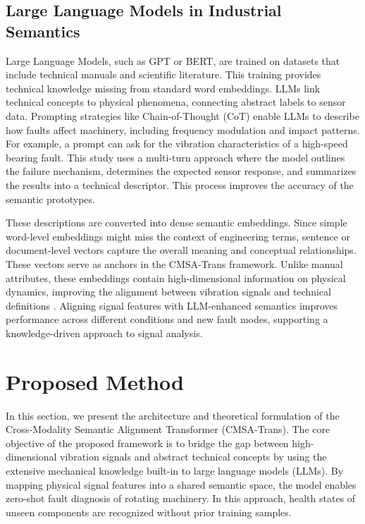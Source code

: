 \documentclass[journal]{IEEEtran}
\begin{document}
\subsection{Large Language Models in Industrial Semantics}

Large Language Models, such as GPT or BERT, are trained on datasets that include technical manuals and scientific literature. This training provides technical knowledge missing from standard word embeddings. LLMs link technical concepts to physical phenomena, connecting abstract labels to sensor data. Prompting strategies like Chain-of-Thought (CoT) enable LLMs to describe how faults affect machinery, including frequency modulation and impact patterns. For example, a prompt can ask for the vibration characteristics of a high-speed bearing fault. This study uses a multi-turn approach where the model outlines the failure mechanism, determines the expected sensor response, and summarizes the results into a technical descriptor. This process improves the accuracy of the semantic prototypes.

These descriptions are converted into dense semantic embeddings. Since simple word-level embeddings might miss the context of engineering terms, sentence or document-level vectors capture the overall meaning and conceptual relationships. These vectors serve as anchors in the CMSA-Trans framework. Unlike manual attributes, these embeddings contain high-dimensional information on physical dynamics, improving the alignment between vibration signals and technical definitions \cite{brown2020language, devlin2018bert, li2024industrial}. Aligning signal features with LLM-enhanced semantics improves performance across different conditions and new fault modes, supporting a knowledge-driven approach to signal analysis.

\section{Proposed Method}
\label{sec:method}

In this section, we present the architecture and theoretical formulation of the Cross-Modality Semantic Alignment Transformer (CMSA-Trans). The core objective of the proposed framework is to bridge the gap between high-dimensional vibration signals and abstract technical concepts by using the extensive mechanical knowledge built-in to large language models (LLMs). By mapping physical signal features into a shared semantic space, the model enables zero-shot fault diagnosis of rotating machinery. In this approach, health states of unseen components are recognized without prior training samples.
\end{document}
